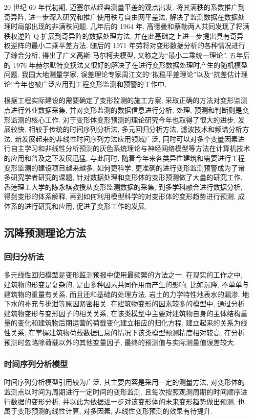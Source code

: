 20 世纪 60 年代初期, 迈塞尔从经典测量平差的观点出发, 将其满秩的系数推广到奇异阵, 进一步深入研究和推广使用秩亏自由网平差法, 解决了监测数据在数据处理时局部出现的非满秩问题. 几年后的 1964 年, 高德曼和蔡勒两人共同发现了将满秩权逆阵 Q 扩展到奇异阵的数据处理方法, 并在此基础之上进一步提出具有奇异权逆阵的最小二乘平差方法. 随后的 1971 年劳将对变形数据分析的各种情况进行了综合分析, 得出了广义高斯-马尔柯夫模型, 又称之为“最小二乘统一理论”. 五年后的 1976 年赫尔默特变换法又很好的解决了在进行变形数据处理时产生的随机模型问题. 我国大地测量学家, 误差理论专家周江文的“拟稳平差理论”以及“抗差估计理论”今年也被广泛应用到工程变形监测和预警的工作中. 

根据工程实际建设的需要确定了变形监测的施工方案, 采取正确的方法对变形监测点进行外业数据采集, 并对变形监测的数据信息进行分析, 处理, 预测和判断则是变形监测的核心工作. 对于变形体变形预测的理论研究今年也取得了很大的进步, 发展较快. 相较于传统的时间序列分析法, 多元回归分析方法, 滤波技术和频谱分析方法, 新发展起来的非线性时间序列方法应用领域广泛, 同时可以对多个变量因素进行自主学习和非线性分析预测的灰色系统理论与神经网络模型等方法在计算机技术的应用和普及之下发展迅猛. 与此同时, 随着今年来各类异性建筑和需要进行工程变形监测的建设项目越来越多, 如何更科学, 更准确的进行变形监测预警成为了诸多研究学者研究的课题, 针对数据处理和变形体的变形预测做了大量的研究工作. 香港理工大学的陈永棋教授从变形监测数据的采集, 到多学科融合进行数据分析, 得到变形的体系解释, 再到如何利用模型科学的对变形体的变形趋势进行预测, 成体系的进行研究和应用, 促进了变形工作的发展. 

\subsection{沉降预测理论方法}
\subsubsection*{回归分析法}
多元线性回归模型是变形监测预报中使用最频繁的方法之一. 在现实的工作之中, 建筑物的形变是复杂的, 是由多种因素共同作用而产生的影响, 比如沉降, 不单单与建筑物的重量有关系, 而且还和基础的处理方法, 岩土的力学特性地表水的漏渗, 地下水的补充与排泄等原因紧密相关. 在建筑物变形的因素较多的模型中, 通过分析建筑物变形与变形因子的相关关系, 在该类模型中主要对建筑物自身的主体结构重量的变化和建筑物后期运营的荷载变化建立相应的归化方程, 建立起来的关系为线性关系, 在掌握建筑物荷载数据信息的情况下该类模型预测精度相对较高, 在分析预测时忽略除荷载以外的其他变量因子, 最终的预测值与实际测量值误差较大. 

\subsubsection*{时间序列分析模型}
时间序列分析模型引用较为广泛, 其主要内容是采用一定的测量方法, 对变形体的监测点以时间为周期进行一定时间的变形监测, 且每次按照观测周期的时间顺序进行数据的变形分析, 并以此为依据进一步对该变形体的未来变形趋势做出预测, 也属于变形预测的线性计算, 对多因素, 非线性变形预测的效果有待提升.

